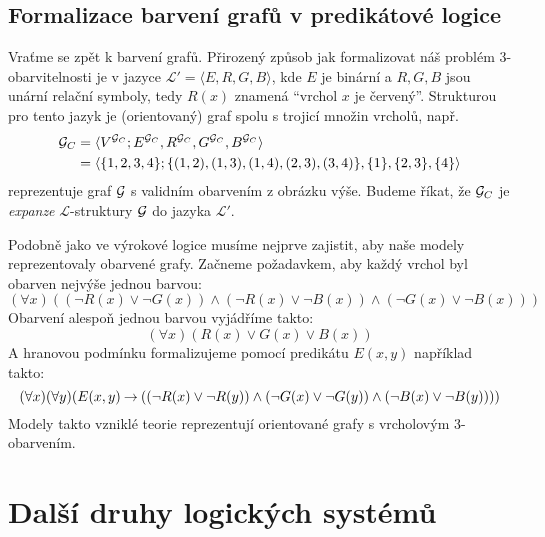 \subsection{Formalizace barvení grafů v predikátové logice}


Vraťme se zpět k barvení grafů. Přirozený způsob jak formalizovat náš problém 3-obarvitelnosti je v jazyce \( \mathcal L' =\langle E, R, G, B \rangle \), kde \(E\) je binární a \(R,G,B\) jsou unární relační symboly, tedy \(R(x)\) znamená ``vrchol \(x\) je červený''. Strukturou pro tento jazyk je (orientovaný) graf spolu s trojicí množin vrcholů, např.
\begin{align*}
\mathcal{G}_C &= \langle V^{\mathcal{G}_C}; E^{\mathcal{G}_C}, R^{\mathcal{G}_C}, G^{\mathcal{G}_C}, B^{\mathcal{G}_C} \rangle \\
&= \langle \{1,2,3,4\}; \{(1,2),(1,3),(1,4),(2,3),(3,4)\}, \{1\}, \{2,3\}, \{4\} \rangle    
\end{align*}
reprezentuje graf \( \mathcal{G} \) s validním obarvením z obrázku výše. Budeme říkat, že \( \mathcal{G}_C \) je \emph{expanze} \(\mathcal L\)-struktury \( \mathcal{G} \) do jazyka \( \mathcal L' \).

Podobně jako ve výrokové logice musíme nejprve zajistit, aby naše modely reprezentovaly obarvené grafy. Začneme požadavkem, aby každý vrchol byl obarven nejvýše jednou barvou:
\[
(\forall x)((\neg R(x) \lor \neg G(x)) \land (\neg R(x) \lor \neg B(x)) \land (\neg G(x) \lor \neg B(x)))
\]
Obarvení alespoň jednou barvou vyjádříme takto:
\[
(\forall x)(R(x) \lor G(x) \lor B(x))
\]
A hranovou podmínku formalizujeme pomocí predikátu \( E(x,y) \) například takto:
\[	
(\forall x)(\forall y)(E(x,y) \mathbin{\rightarrow} ((\neg R(x) \lor \neg R(y)) \land (\neg G(x) \lor \neg G(y)) \land (\neg B(x) \lor \neg B(y))))
\]
Modely takto vzniklé teorie reprezentují orientované grafy s vrcholovým 3-obarvením. 


\section{Další druhy logických systémů}

